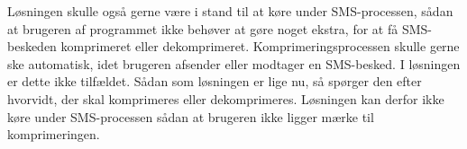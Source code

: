 Løsningen skulle også gerne være i stand til at køre under SMS-processen, sådan at brugeren af programmet ikke behøver at gøre noget ekstra, for at få SMS-beskeden komprimeret eller dekomprimeret. Komprimeringsprocessen skulle gerne ske automatisk, idet brugeren afsender eller modtager en SMS-besked. I løsningen er dette ikke tilfældet. Sådan som løsningen er lige nu, så spørger den efter hvorvidt, der skal komprimeres eller dekomprimeres. Løsningen kan derfor ikke køre under SMS-processen sådan at brugeren ikke ligger mærke til komprimeringen.